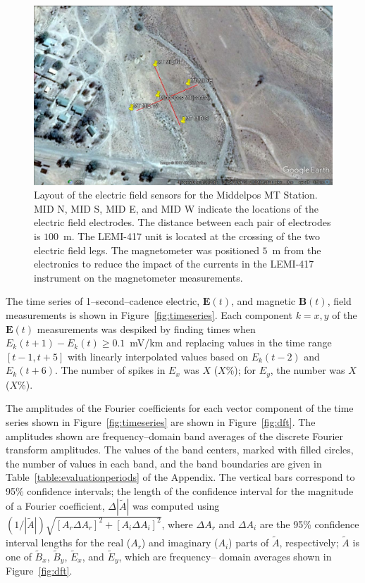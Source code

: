 \documentclass[draft,linenumbers]{agujournal2018}
\begin{document}
\begin{figure}[h]
  \centering
  \includegraphics[width=\textwidth]{figures/site.png}
  \caption{Layout of the electric field sensors for the Middelpos MT Station. MID N, MID S, MID E, and MID W indicate the locations of the electric field electrodes. The distance between each pair of electrodes is $100$~m. The LEMI-417 unit is located at the crossing of the two electric field legs. The magnetometer was positioned $5$~m from the electronics to reduce the impact of the currents in the LEMI-417 instrument on the magnetometer measurements. 
}
 \label{fig:site}
\end{figure}

The time series of 1--second--cadence electric, $\mathbf{E}(t)$, and magnetic $\mathbf{B}(t)$, field measurements is shown in Figure~\ref{fig:timeseries}. Each component $k=x, y$ of the $\mathbf{E}(t)$ measurements was despiked by finding times when $E_k(t+1)-E_k(t)\ge 0.1$~mV/km and replacing values in the time range $[t-1, t+5]$ with linearly interpolated values based on $E_k(t-2)$ and $E_k(t+6)$. The number of spikes in $E_x$ was $X$ ($X$\%); for $E_y$, the number was $X$ ($X$\%).

The amplitudes of the Fourier coefficients for each vector component of the time series shown in Figure~\ref{fig:timeseries} are shown in Figure~\ref{fig:dft}. The amplitudes shown are frequency--domain band averages of the discrete Fourier transform amplitudes. The values of the band centers, marked with filled circles, the number of values in each band, and the band boundaries are given in Table~\ref{table:evaluationperiods} of the Appendix. The vertical bars correspond to 95\% confidence intervals; the length of the confidence interval for the magnitude of a Fourier coefficient, $\Delta|\widetilde{A}|$ was computed using $(1/|\widetilde{A}|)\sqrt{[A_r\Delta A_r]^2 + [A_i\Delta A_i]^2}$, where $\Delta A_r$ and $\Delta A_i$ are the 95\% confidence interval lengths for the real ($A_r$) and imaginary ($A_i$) parts of $\widetilde{A}$, respectively; $\widetilde{A}$ is one of $\widetilde{B}_x$, $\widetilde{B}_y$, $\widetilde{E}_x$, and $\widetilde{E}_y$, which are frequency-- domain averages shown in Figure~\ref{fig:dft}.
\end{document}
